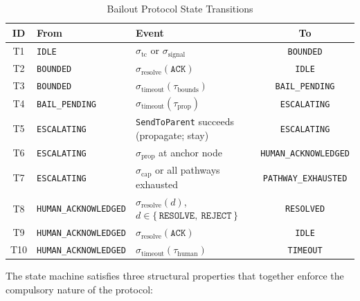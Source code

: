 \begin{table}[t]
\caption{Bailout Protocol State Transitions}
\label{tab:bp-transitions}
\medskip
\noindent\begin{tabular}{cllc}
\toprule
\textbf{ID} & \textbf{From} & \textbf{Event} & \textbf{To} \\
\midrule
T1 & \texttt{IDLE}                  & $\sigma_{\text{tc}}$ or $\sigma_{\text{signal}}$                      & \texttt{BOUNDED} \\
T2 & \texttt{BOUNDED}               & $\sigma_{\text{resolve}}(\texttt{ACK})$                                & \texttt{IDLE} \\
T3 & \texttt{BOUNDED}               & $\sigma_{\text{timeout}}(\tau_{\text{bounds}})$                        & \texttt{BAIL\_PENDING} \\
T4 & \texttt{BAIL\_PENDING}         & $\sigma_{\text{timeout}}(\tau_{\text{prop}})$                          & \texttt{ESCALATING} \\
T5 & \texttt{ESCALATING}           & \texttt{SendToParent} succeeds (propagate; stay)                     & \texttt{ESCALATING} \\
T6 & \texttt{ESCALATING}           & $\sigma_{\text{prop}}$ at anchor node                                & \texttt{HUMAN\_ACKNOWLEDGED} \\
T7 & \texttt{ESCALATING}           & $\sigma_{\text{cap}}$ or all pathways exhausted                      & \texttt{PATHWAY\_EXHAUSTED} \\
T8 & \texttt{HUMAN\_ACKNOWLEDGED}  & $\sigma_{\text{resolve}}(d)$, $d \in \{\,\texttt{RESOLVE},\ \texttt{REJECT}\,\}$ & \texttt{RESOLVED} \\
T9 & \texttt{HUMAN\_ACKNOWLEDGED}  & $\sigma_{\text{resolve}}(\texttt{ACK})$                               & \texttt{IDLE} \\
T10 & \texttt{HUMAN\_ACKNOWLEDGED}  & $\sigma_{\text{timeout}}(\tau_{\text{human}})$                         & \texttt{TIMEOUT} \\
\bottomrule
\end{tabular}
\end{table}

The state machine satisfies three structural properties that together enforce the compulsory nature of the protocol:


